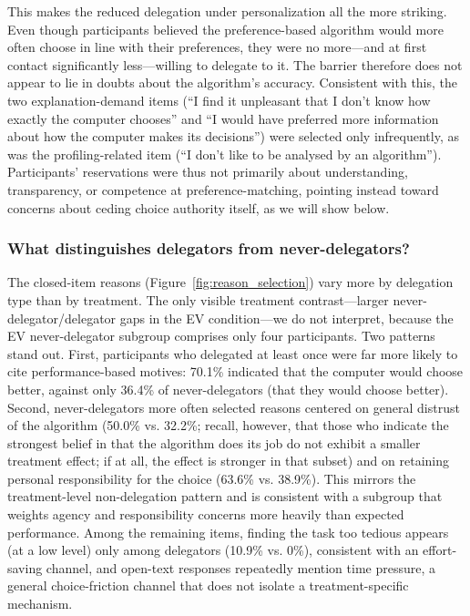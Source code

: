 \documentclass[a4paper, 12pt, fleqn]{article}
\theoremstyle{definition}
\begin{document}
This makes the reduced delegation under personalization all the more striking. Even though participants believed the preference-based algorithm would more often choose in line with their preferences, they were no more---and at first contact significantly less---willing to delegate to it. The barrier therefore does not appear to lie in doubts about the algorithm's accuracy. Consistent with this, the two explanation-demand items (``I find it unpleasant that I don't know how exactly the computer chooses'' and ``I would have preferred more information about how the computer makes its decisions'') were selected only infrequently, as was the profiling-related item (``I don't like to be analysed by an algorithm''). Participants' reservations were thus not primarily about understanding, transparency, or competence at preference-matching, pointing instead toward concerns about ceding choice authority itself, as we will show below.

\subsubsection*{What distinguishes delegators from never-delegators?}
The closed-item reasons (Figure~\ref{fig:reason_selection}) vary more by delegation type than by treatment. The only visible treatment contrast---larger never-delegator/delegator gaps in the EV condition---we do not interpret, because the EV never-delegator subgroup comprises only four participants. Two patterns stand out. First, participants who delegated at least once were far more likely to cite performance-based motives: 70.1\% indicated that the computer would choose better, against only 36.4\% of never-delegators (that they would choose better). Second, never-delegators more often selected reasons centered on general distrust of the algorithm (50.0\% vs. 32.2\%; recall, however, that those who indicate the strongest belief in that the algorithm does its job do not exhibit a smaller treatment effect; if at all, the effect is stronger in that subset) and on retaining personal responsibility for the choice (63.6\% vs. 38.9\%). This mirrors the treatment-level non-delegation pattern and is consistent with a subgroup that weights agency and responsibility concerns more heavily than expected performance. Among the remaining items, finding the task too tedious appears (at a low level) only among delegators (10.9\% vs. 0\%), consistent with an effort-saving channel, and open-text responses repeatedly mention time pressure, a general choice-friction channel that does not isolate a treatment-specific mechanism.
\end{document}
